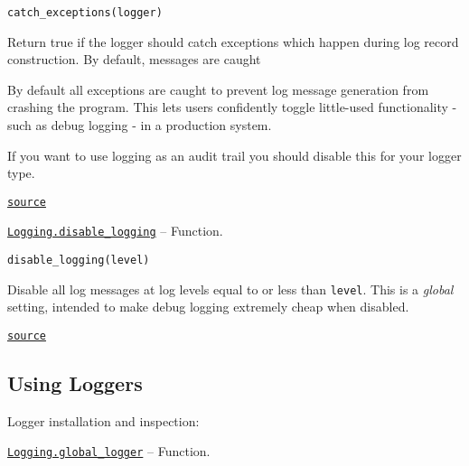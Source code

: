 \begin{adjustwidth}{2em}{0pt}


\begin{verbatim}
catch_exceptions(logger)
\end{verbatim}

Return true if the logger should catch exceptions which happen during log record construction.  By default, messages are caught

By default all exceptions are caught to prevent log message generation from crashing the program.  This lets users confidently toggle little-used functionality - such as debug logging - in a production system.

If you want to use logging as an audit trail you should disable this for your logger type.



\href{https://github.com/JuliaLang/julia/blob/44fa15b1502a45eac76c9017af94332d4557b251/base/logging.jl#L58-L70}{\texttt{source}}


\end{adjustwidth}
\hypertarget{10677278458507378523}{} 
\hyperlink{10677278458507378523}{\texttt{Logging.disable\_logging}}  -- {Function.}

\begin{adjustwidth}{2em}{0pt}


\begin{verbatim}
disable_logging(level)
\end{verbatim}

Disable all log messages at log levels equal to or less than \texttt{level}.  This is a \emph{global} setting, intended to make debug logging extremely cheap when disabled.



\href{https://github.com/JuliaLang/julia/blob/44fa15b1502a45eac76c9017af94332d4557b251/base/logging.jl#L408-L414}{\texttt{source}}


\end{adjustwidth}

\hypertarget{14824596935687234191}{}


\subsection{Using Loggers}



Logger installation and inspection:


\hypertarget{4306559652149699055}{} 
\hyperlink{4306559652149699055}{\texttt{Logging.global\_logger}}  -- {Function.}

